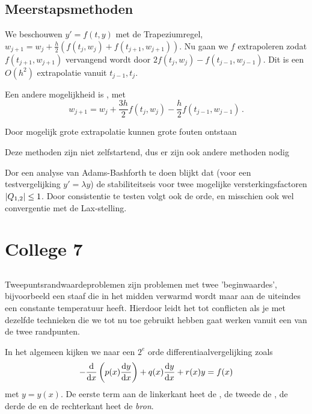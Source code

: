 \documentclass{2wn20summary}
\begin{document}
		\subsection{Meerstapsmethoden}
			We beschouwen $y'=f(t,y)$ met de Trapeziumregel, $w_{j+1} = w_j + \frac{h}{2} (f(t_j,w_j) + f(t_{j+1}, w_{j+1}))$. Nu gaan we $f$ extrapoleren zodat $f(t_{j+1}, w_{j+1})$ vervangend wordt door $2f(t_j,w_j)-f(t_{j-1},w_{j-1})$. Dit is een $O(h^2)$ extrapolatie vanuit $t_{j-1},t_j$.
			
			Een andere mogelijkheid is , met
			\[ 
				w_{j+1} = w_j + \frac{3h}{2} f(t_j,w_j) - \frac{h}{2} f(t_{j-1},w_{j-1}) \,.
			 \]
			 \begin{opm}
			 	Door mogelijk grote extrapolatie kunnen grote fouten ontstaan
			 \end{opm}
			 \begin{opm}
				 Deze methoden zijn niet zelfstartend, dus er zijn ook andere methoden nodig
			 \end{opm}
			 
			 Dor een analyse van Adams-Bashforth te doen blijkt dat (voor een testvergelijking $y'=\lambda y$) de stabiliteitseis voor twee mogelijke versterkingsfactoren ${\left|Q_{1,2}\right|} \le 1$. Door consistentie te testen volgt ook de orde, en misschien ook wel convergentie met de Lax-stelling.
		                  

	\section{College 7}
	
		\subsection{}
		Tweepuntsrandwaardeproblemen zijn problemen met twee 'beginwaardes', bijvoorbeeld een staaf die in het midden verwarmd wordt maar aan de uiteindes een constante temperatuur heeft. Hierdoor leidt het tot conflicten als je met dezelfde technieken die we tot nu toe gebruikt hebben gaat werken vanuit een van de twee randpunten.
		
		In het algemeen kijken we naar een $2^e$ orde differentiaalvergelijking zoals
		\[ 
			- \frac{\mathop{}\!\mathrm{d}}{\mathop{}\!\mathrm{d} x} \left( p(x) \frac{\mathop{}\!\mathrm{d} y}{\mathop{}\!\mathrm{d} x}\right) + q(x) \frac{\mathop{}\!\mathrm{d} y}{\mathop{}\!\mathrm{d} x} + r(x) y = f(x)
		 \]
		 met $y=y(x)$. De eerste term aan de linkerkant heet de , de tweede de , de derde de  en de rechterkant heet de \textit{bron}.
		 
\end{document}
